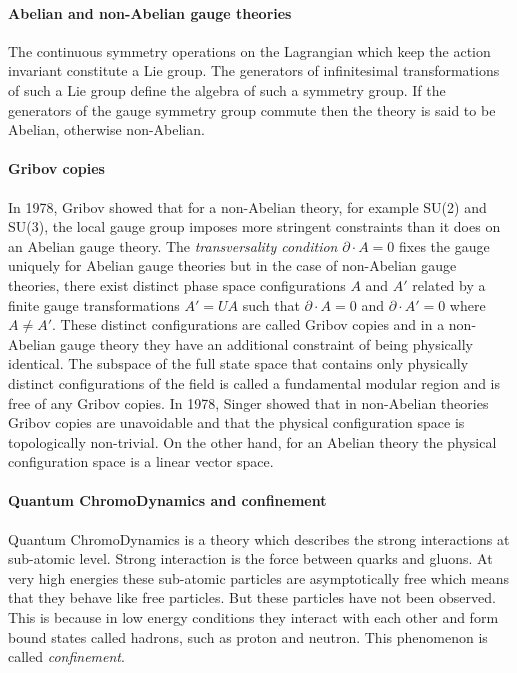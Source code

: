 \paragraph{Abelian and non-Abelian gauge theories}
The continuous symmetry operations on the Lagrangian which keep the action invariant constitute a Lie group. The generators of infinitesimal transformations of such a Lie group define the algebra of such a symmetry group. If the generators of the gauge symmetry group commute then the theory is said to be Abelian, otherwise non-Abelian.

\paragraph{Gribov copies}
In 1978, Gribov showed that for a non-Abelian theory, for
example SU(2) and SU(3), the local gauge group imposes more stringent
constraints than it does on an Abelian gauge theory. The
\emph{transversality condition} $ \partial \cdot A=0$ fixes the gauge
uniquely for Abelian gauge theories but in the case of non-Abelian gauge
theories, there exist distinct phase space configurations $A$ and $A'$
related by a finite gauge transformations $A' = U A$ such that
$\partial\cdot A=0$ and $\partial\cdot A'=0$ where $A \neq A'$. These
distinct configurations are called Gribov copies and in a non-Abelian
gauge theory they have an additional constraint of being physically
identical. The subspace of the full state space that contains only
physically distinct configurations of the field is called a fundamental
modular region and is free of any Gribov copies. In 1978,
Singer showed that in non-Abelian theories Gribov copies are
unavoidable and that the physical configuration space is topologically
non-trivial. On the other hand, for an Abelian theory the physical
configuration space is a linear vector space.

\paragraph{Quantum ChromoDynamics and confinement}
Quantum ChromoDynamics is a theory which describes the strong
interactions at sub-atomic level. Strong interaction is the force between
quarks and gluons. At very high energies these sub-atomic particles are
asymptotically free which means that they behave like free particles. But
these particles have not been observed. This is because in low energy
conditions they interact with each other and form bound states called
hadrons, such as proton and neutron. This phenomenon is called
\emph{confinement}.

